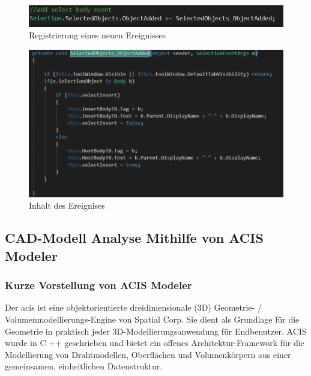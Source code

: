 \documentclass[14pt,a4paper,titlepage]{article}
\begin{document}
\begin{itemize}
				\begin{figure}[h!]
					\centering
					\includegraphics[width=0.8\linewidth]{ObjectAdded.png}
					\caption{Registrierung eines neuen Ereignisses}
				\end{figure}
				\begin{figure}[h!]
					\centering
					\includegraphics[width=0.8\linewidth]{ObjectAddedImplement.png}
					\caption{Inhalt des Ereignises}
				\end{figure}
			\end{itemize}
			\pagebreak
				
			
		\subsection{CAD-Modell Analyse Mithilfe von ACIS Modeler}
			\subsubsection{Kurze Vorstellung von ACIS Modeler}
			Der \ac{acis} ist eine objektorientierte dreidimensionale (3D) Geometrie- / Volumenmodellierungs-Engine von Spatial Corp. Sie dient als Grundlage für die Geometrie in praktisch jeder 3D-Modellierungsanwendung für Endbenutzer. ACIS wurde in C ++ geschrieben und bietet ein offenes Architektur-Framework für die Modellierung von Drahtmodellen, Oberflächen und Volumenkörpern aus einer gemeinsamen, einheitlichen Datenstruktur.
\end{document}
